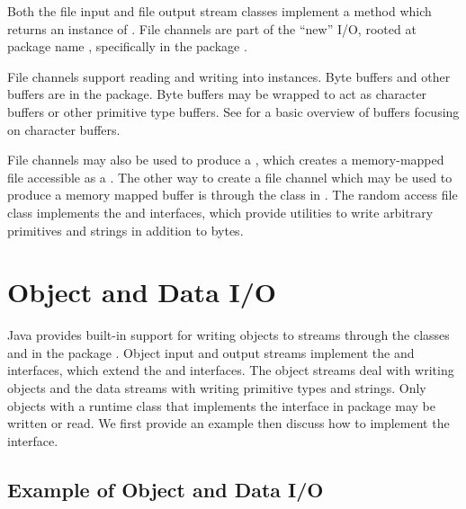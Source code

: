 Both the file input and file output stream classes implement a
 method which returns an instance of
.  File channels are part of the ``new'' I/O,
rooted at package name , specifically in the
package .  

File channels support reading and writing into 
instances.  Byte buffers and other buffers are in the 
package.  Byte buffers may be wrapped to act as character buffers or
other primitive type buffers.  See  for a
basic overview of buffers focusing on character buffers.

File channels may also be used to produce a ,
which creates a memory-mapped file accessible as a .
The other way to create a file channel which may be used to produce a
memory mapped buffer is through the  class in
.  The random access file class implements the
 and  interfaces, which provide utilities
to write arbitrary primitives and strings in addition to bytes.

\section{Object and Data I/O}

Java provides built-in support for writing objects to streams through
the classes  and  in
the package .  Object input and output streams implement
the  and  interfaces, which
extend the  and  interfaces.  The
object streams deal with writing objects and the data streams with
writing primitive types and strings.  Only objects with a runtime
class that implements the  interface in package
 may be written or read.  We first provide an example
then discuss how to implement the  interface.


\subsection{Example of Object and Data I/O}

